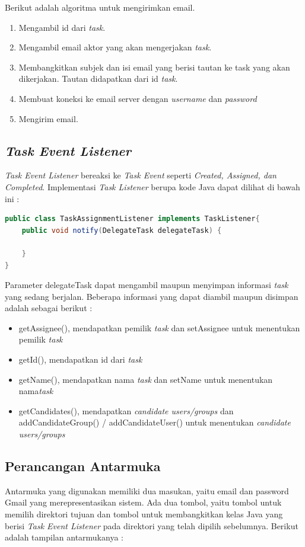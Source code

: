 Berikut adalah algoritma untuk mengirimkan email.
\begin{enumerate}
	\item Mengambil id dari \textit{task}.
	\item Mengambil email aktor yang akan mengerjakan \textit{task}.
	\item Membangkitkan subjek dan isi email yang berisi tautan ke task yang akan dikerjakan. Tautan didapatkan dari id \textit{task}.
	\item Membuat koneksi ke email server dengan \textit{username} dan \textit{password}
	\item Mengirim email.
\end{enumerate}

\subsection{\textit{Task Event Listener}}
\label{sec:perancangansistem_taskeventlistener}
\textit{Task Event Listener} bereaksi ke \textit{Task Event} seperti \textit{Created, Assigned, dan Completed}. Implementasi \textit{Task Listener} berupa kode Java dapat dilihat di bawah ini :
\begin{lstlisting}[language=Java,basicstyle=\tiny,caption=TaskAssignmentListener.java]
public class TaskAssignmentListener implements TaskListener{
	public void notify(DelegateTask delegateTask) {
	
	}
}
\end{lstlisting}

Parameter delegateTask dapat mengambil maupun menyimpan informasi \textit{task} yang sedang berjalan. Beberapa informasi yang dapat diambil maupun disimpan adalah sebagai berikut :
\begin{itemize}
	\item getAssignee(), mendapatkan pemilik \textit{task} dan setAssignee untuk menentukan pemilik \textit{task}
	\item getId(), mendapatkan id dari \textit{task}
	\item getName(), mendapatkan nama \textit{task} dan setName untuk menentukan nama\textit{task}
	\item getCandidates(), mendapatkan \textit{candidate users/groups} dan addCandidateGroup() / addCandidateUser() untuk menentukan \textit{candidate users/groups}
	
\end{itemize}

\subsection{Perancangan Antarmuka}
\label{sec:perancangansistem_antarmuka}
Antarmuka yang digunakan memiliki dua masukan, yaitu email dan password Gmail yang merepresentasikan sistem. Ada dua tombol, yaitu tombol untuk memilih direktori tujuan dan tombol untuk membangkitkan kelas Java yang berisi \textit{Task Event Listener} pada direktori yang telah dipilih sebelumnya. Berikut adalah tampilan antarmukanya :

